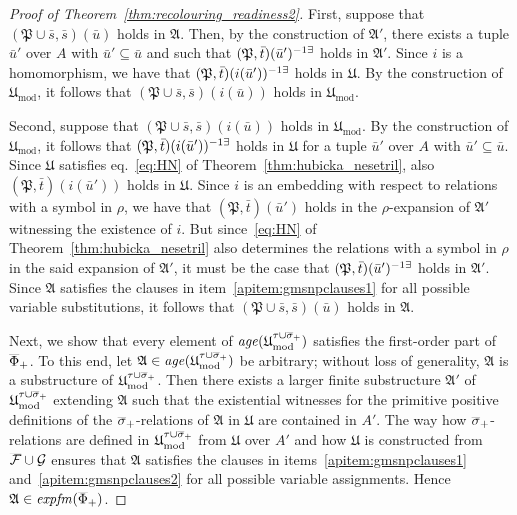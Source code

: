 \documentclass[oneside,reqno,12pt]{amsart}
\theoremstyle{plain}
\theoremstyle{remark}
\newenvironment{claimproof}[1][\proofname]
{\renewcommand\qedsymbol{$\diamond$}\proof[#1]}
{\endproof}
\newcommand{\struct}[1]{\mathfrak{#1}}
\newcommand{\age}{\ensuremath{\mathit{age}}\xspace}
\newcommand{\efm}{\ensuremath{\mathit{expfm}}\xspace}
\newcommand{\cplmt}[1]{\smash{\overline{#1}}}
\newcommand{\prexists}[1]{#1\smash{^{-1\exists}}}
\DeclareMathOperator{\mo}{mod}
\begin{document}
{\begin{proof}[Proof of Theorem~\ref{thm:recolouring_readiness2}]
\begin{claimproof}
First, suppose that $(\struct P\cup\bar s,\bar s)(\bar u)$ holds in $\struct{A}$.
Then, by the construction of $\struct A'$, there exists a tuple $\bar u'$ over $A$ with $\bar u'\subseteq \bar u$  and such that  $\prexists{(\struct P,\bar t)(\bar{u}')}$ holds in $\struct A'$.
Since $i$ is a homomorphism, we have that $\prexists{(\struct P,\bar t)(i(\bar{u}'))}$ holds in $\struct U$. 
By the construction of $\struct{U}_{\mo}$, it follows that $(\struct P\cup\bar s,\bar s)(i(\bar u))$ holds in $\struct{U}_{\mo}$.


Second, suppose that $(\struct P\cup\bar s,\bar s)(i(\bar u))$ holds in $\struct{U}_{\mo}$.
By the construction of $\struct{U}_{\mo}$, it follows that $\prexists{(\struct P,\bar t)(i(\bar{u}'))}$ holds in $\struct U$ for a tuple $\bar u'$ over $A$ with $\bar u'\subseteq \bar u$.
Since $\struct U$ satisfies eq.~\eqref{eq:HN} of Theorem~\ref{thm:hubicka_nesetril}, also $(\struct P,\bar t)(i(\bar{u}'))$ holds in $\struct U$.
Since $i$ is an embedding with respect to  relations with a symbol in $\rho$, we have that $(\struct P,\bar t)(\bar u')$ holds in the $\rho$-expansion of $\struct{A}'$ witnessing the existence of $i$.
But since~\eqref{eq:HN} of Theorem~\ref{thm:hubicka_nesetril} also determines the relations with a symbol in $\rho$ in the said expansion of $\struct{A}'$, it must be the case that $\prexists{(\struct P,\bar t)(\bar{u}')}$ holds in $\struct A'$.
Since $\struct{A}$ satisfies the clauses in item~\eqref{apitem:gmsnpclauses1} for all possible variable substitutions,  it follows that $(\struct P\cup\bar s,\bar s)(\bar u)$ holds in $\struct{A}$. 



Next, we show that every element of $\age(\struct U_{\mo}^{\tau\cup\cplmt{\sigma}_+})$ satisfies the first-order part of $\cplmt{\Phi}_+$.
To this end, let $\struct{A}\in \age(\struct U_{\mo}^{\tau\cup\cplmt{\sigma}_+})$ be arbitrary; without loss of generality, $\struct{A}$ is a substructure of $\struct U_{\mo}^{\tau\cup\cplmt{\sigma}_+}$.
Then there exists a larger finite substructure $\struct{A}'$ of $\struct U_{\mo}^{\tau\cup\cplmt{\sigma}_+}$ extending $\struct{A}$ such that the existential witnesses for the primitive positive definitions of the $\cplmt{\sigma}_+$-relations of $\struct{A}$ in $\struct{U}$ are contained in $A'$.
The way how $\cplmt{\sigma}_+$-relations are defined in $\struct U_{\mo}^{\tau\cup\cplmt{\sigma}_+}$ from $\struct{U}$ over $A'$ and how $\struct{U}$ is constructed from $\cplmt{\mathcal{F}}\cup \mathcal{G}$ ensures that $\struct{A}$ satisfies the clauses in items~\eqref{apitem:gmsnpclauses1} and~\eqref{apitem:gmsnpclauses2} for all possible variable assignments.
Hence $\struct{A}\in \efm(\cplmt{\Phi}_+)$.
\end{claimproof}




\end{proof}}
\end{document}
